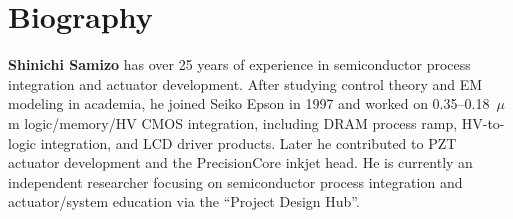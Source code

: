 \documentclass[conference]{IEEEtran}
\begin{document}
\section*{Biography}
\textbf{Shinichi Samizo} has over 25 years of experience in semiconductor process integration and actuator development. After studying control theory and EM modeling in academia, he joined Seiko Epson in 1997 and worked on 0.35--0.18~\(\mu\)m logic/memory/HV CMOS integration, including DRAM process ramp, HV-to-logic integration, and LCD driver products. Later he contributed to PZT actuator development and the PrecisionCore inkjet head. He is currently an independent researcher focusing on semiconductor process integration and actuator/system education via the “Project Design Hub”.
\end{document}
